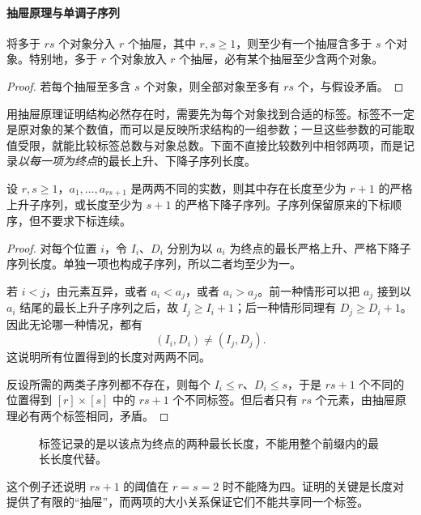 \documentclass[lang=cn,a4paper,fontset=none,zihao=false,10pt,openany,twoside]{beautybook}
\numberwithin{algorithm}{chapter}
\begin{document}
\paragraph{抽屉原理与单调子序列}
\begin{proposition}[抽屉原理]\label{prop:pigeonhole}
将多于 $rs$ 个对象分入 $r$ 个抽屉，其中 $r,s\ge1$，则至少有一个抽屉含多于 $s$ 个对象。特别地，多于 $r$ 个对象放入 $r$ 个抽屉，必有某个抽屉至少含两个对象。
\end{proposition}
\begin{proof}
若每个抽屉至多含 $s$ 个对象，则全部对象至多有 $rs$ 个，与假设矛盾。
\end{proof}
用抽屉原理证明结构必然存在时，需要先为每个对象找到合适的标签。标签不一定是原对象的某个数值，而可以是反映所求结构的一组参数；一旦这些参数的可能取值受限，就能比较标签总数与对象总数。下面不直接比较数列中相邻两项，而是记录\emph{以每一项为终点}的最长上升、下降子序列长度。
\begin{theorem}\label{thm:monotone-subsequence}
设 $r,s\ge1$，$a_1,\ldots,a_{rs+1}$ 是两两不同的实数，则其中存在长度至少为 $r+1$ 的严格上升子序列，或长度至少为 $s+1$ 的严格下降子序列。子序列保留原来的下标顺序，但不要求下标连续。
\end{theorem}
\begin{proof}
对每个位置 $i$，令 $I_i$、$D_i$ 分别为以 $a_i$ 为终点的最长严格上升、严格下降子序列长度。单独一项也构成子序列，所以二者均至少为一。

若 $i<j$，由元素互异，或者 $a_i<a_j$，或者 $a_i>a_j$。前一种情形可以把 $a_j$ 接到以 $a_i$ 结尾的最长上升子序列之后，故 $I_j\ge I_i+1$；后一种情形同理有 $D_j\ge D_i+1$。因此无论哪一种情况，都有
\[
 (I_i,D_i)\ne(I_j,D_j).
\]
这说明所有位置得到的长度对两两不同。

反设所需的两类子序列都不存在，则每个 $I_i\le r$、$D_i\le s$，于是 $rs+1$ 个不同的位置得到 $[r]\times[s]$ 中的 $rs+1$ 个不同标签。但后者只有 $rs$ 个元素，由抽屉原理必有两个标签相同，矛盾。
\end{proof}
\begin{figure}[H]
\centering
{}
\caption{标签记录的是以该点为终点的两种最长长度，不能用整个前缀内的最长长度代替。}
\end{figure}
这个例子还说明 $rs+1$ 的阈值在 $r=s=2$ 时不能降为四。证明的关键是长度对提供了有限的“抽屉”，而两项的大小关系保证它们不能共享同一个标签。
\end{document}
